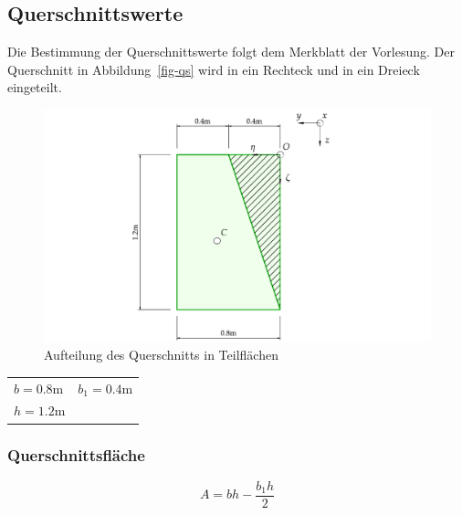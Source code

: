 \documentclass[
  12pt,
  letterpaper,
  DIV=11,
  egregdoesnotlikesansseriftitles]{scrartcl}
\begin{document}
\hypertarget{querschnittswerte}{%
\subsection{Querschnittswerte}\label{querschnittswerte}}

Die Bestimmung der Querschnittswerte folgt dem Merkblatt der Vorlesung.
Der Querschnitt in Abbildung~\ref{fig-qs} wird in ein Rechteck und in
ein Dreieck eingeteilt.

\begin{figure}[H]

{\centering \includegraphics{BSI_HS23_Testat_03_files/mediabag/../images/Testat_03_HS23_QS_aufteilung.pdf}

}

\caption{Aufteilung des Querschnitts in Teilflächen}

\end{figure}

\begin{longtable}[]{@{}
  >{\raggedright\arraybackslash}p{}
  >{\raggedright\arraybackslash}p{}@{}}
\toprule\noalign{}
\endhead
\bottomrule\noalign{}
\endlastfoot
\(b = 0.8 \text{m}\) & \(b_{1} = 0.4 \text{m}\) \\
\(h = 1.2 \text{m}\) & \\
\end{longtable}

\hypertarget{querschnittsfluxe4che}{%
\subsubsection{Querschnittsfläche}\label{querschnittsfluxe4che}}

\begin{equation}A = b h - \frac{b_{1} h}{2}\end{equation}
\end{document}
